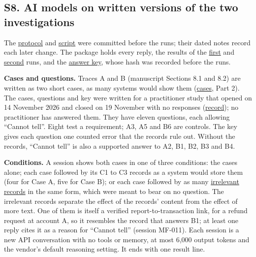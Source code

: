 \documentclass[
  11pt,
]{article}
\begin{document}
\FloatBarrier

\hypertarget{s8.-ai-models-on-written-versions-of-the-two-investigations}{%
\subsection{S8. AI models on written versions of the two
investigations}\label{s8.-ai-models-on-written-versions-of-the-two-investigations}}

\suppressfloats[t]

The \href{tools/agent_test/README.md}{protocol} and
\href{tools/agent_test/agent_test.py}{script} were committed before the
runs; their dated notes record each later change. The package holds
every reply, the results of the
\href{tools/agent_test/results/main/results.md}{first} and
\href{tools/agent_test/results/practice/results.md}{second} runs, and
the \href{tools/practitioner_study/ANSWER_KEY.md}{answer key}, whose
hash was recorded before the runs.

\textbf{Cases and questions.} Traces A and B (manuscript Sections 8.1
and 8.2) are written as two short cases, as many systems would show them
(\href{tools/practitioner_study/INSTRUMENT.md}{cases}, Part 2). The
cases, questions and key were written for a practitioner study that
opened on 14 November 2026 and closed on 19 November with no responses
(\href{tools/practitioner_study/README.md}{record}); no practitioner has
answered them. They have eleven questions, each allowing ``Cannot
tell''. Eight test a requirement; A3, A5 and B6 are controls. The key
gives each question one counted error that the records rule out. Without
the records, ``Cannot tell'' is also a supported answer to A2, B1, B2,
B3 and B4.

\textbf{Conditions.} A session shows both cases in one of three
conditions: the cases alone; each case followed by its C1 to C3 records
as a system would store them (four for Case A, five for Case B); or each
case followed by as many \href{tools/agent_test/FILLER.md}{irrelevant
records} in the same form, which were meant to bear on no question. The
irrelevant records separate the effect of the records' content from the
effect of more text. One of them is itself a verified
report-to-transaction link, for a refund request at account A, so it
resembles the record that answers B1; at least one reply cites it as a
reason for ``Cannot tell'' (session \mbox{MF-011}). Each session is a
new API conversation with no tools or memory, at most 6,000 output
tokens and the vendor's default reasoning setting. It ends with one
result line.
\end{document}
